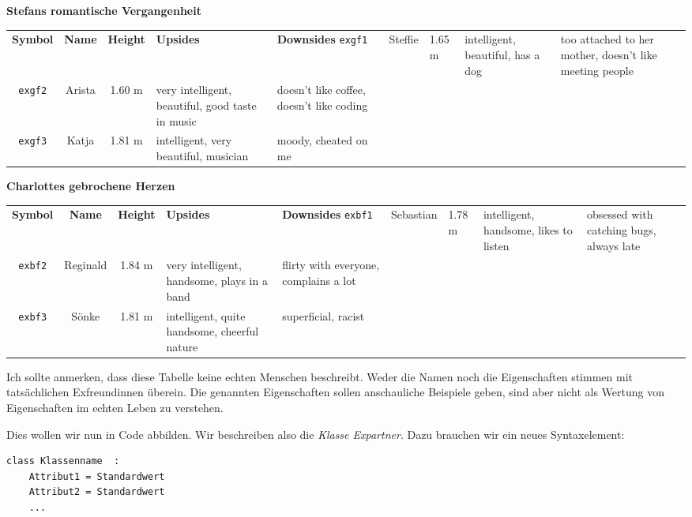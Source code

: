 \begin{tcolorbox}[title=Eine Liste von Liebschaften]
\begin{center}
\textbf{Stefans romantische Vergangenheit}
\begin{tabular}{c|ccp{.3\linewidth}p{.3\linewidth}}
	\textbf{Symbol} & \textbf{Name} & \textbf{Height} & \textbf{Upsides}                                 & \textbf{Downsides} \tabcrlf
	\texttt{exgf1}  & Steffie       & 1.65 m          & intelligent, beautiful, has a dog                & too attached to her mother, 
																																																				doesn't like meeting people \\
	\texttt{exgf2}  & Arista        & 1.60 m          & very intelligent, beautiful, good taste in music & doesn't like coffee, doesn't like coding \\
	\texttt{exgf3}  & Katja         & 1.81 m          & intelligent, very beautiful, musician            & moody, cheated on me
\end{tabular}
\end{center}

\begin{center}
\textbf{Charlottes gebrochene Herzen}
\begin{tabular}{c|ccp{.3\linewidth}p{.3\linewidth}}
	\textbf{Symbol} & \textbf{Name} & \textbf{Height} & \textbf{Upsides}                                 & \textbf{Downsides} \tabcrlf
	\texttt{exbf1}  & Sebastian     & 1.78 m          & intelligent, handsome, likes to listen           & obsessed with catching bugs, always late \\
	\texttt{exbf2}  & Reginald      & 1.84 m          & very intelligent, handsome, plays in a band      & flirty with everyone, complains a lot \\
	\texttt{exbf3}  & Sönke         & 1.81 m          & intelligent, quite handsome, cheerful nature     & superficial, racist
\end{tabular}
\end{center}
Ich sollte anmerken, dass diese Tabelle keine echten Menschen beschreibt. Weder die Namen noch die Eigenschaften stimmen mit tatsächlichen Exfreundinnen überein. Die genannten Eigenschaften sollen anschauliche Beispiele geben, sind aber nicht als Wertung von Eigenschaften im echten Leben zu verstehen.
\end{tcolorbox}

Dies wollen wir nun in Code abbilden. Wir beschreiben also die \emph{Klasse Expartner}. Dazu brauchen wir ein neues Syntaxelement:
\begin{codebox}
\begin{verbatim}
class Klassenname  :
    Attribut1 = Standardwert
    Attribut2 = Standardwert
    ...
\end{verbatim}
\end{codebox}

